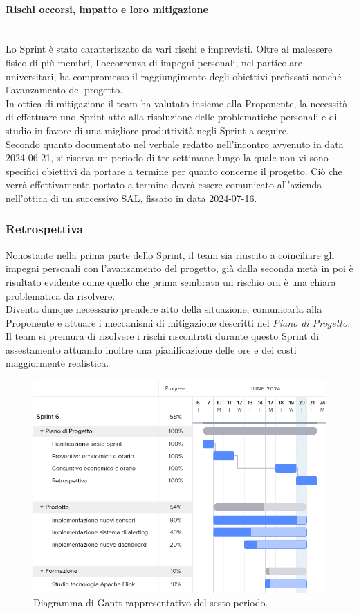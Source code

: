 \documentclass[8pt]{article}
\newcommand{\subsubsubsection}[1]{\paragraph{#1}\mbox{}\\}
\begin{document}
\subsubsubsection{Rischi occorsi, impatto e loro mitigazione}
Lo Sprint è stato caratterizzato da vari rischi e imprevisti. Oltre al malessere fisico di più membri, l'occorrenza di impegni personali, nel particolare universitari, ha compromesso il raggiungimento degli obiettivi prefissati nonché l'avanzamento del progetto.\\
In ottica di mitigazione il team ha valutato insieme alla Proponente, la necessità di effettuare uno Sprint atto alla risoluzione delle problematiche personali e di studio in favore di una migliore produttività negli Sprint a seguire.\\
Secondo quanto documentato nel verbale redatto nell'incontro avvenuto in data 2024-06-21, si riserva un periodo di tre settimane lungo la quale non vi sono specifici obiettivi da portare a termine per quanto concerne il progetto. 
Ciò che verrà effettivamente portato a termine dovrà essere comunicato all'azienda nell'ottica di un successivo SAL, fissato in data 2024-07-16.

\subsubsection{Retrospettiva}

Nonostante nella prima parte dello Sprint, il team sia riuscito a coinciliare gli impegni personali con l'avanzamento del progetto, già dalla seconda metà in poi è risultato evidente come quello che prima sembrava un rischio ora è una chiara problematica da risolvere.\\
Diventa dunque necessario prendere atto della situazione, comunicarla alla Proponente e attuare i meccanismi di mitigazione descritti nel \textit{Piano di Progetto}. 
Il team si premura di risolvere i rischi riscontrati durante questo Sprint di assestamento attuando inoltre una pianificazione delle ore e dei costi maggiormente realistica.

\begin{figure}[h!]
    \centering
    \includegraphics[width=13cm]{./images_pdp/gantt6.png}
    \caption{Diagramma di Gantt rappresentativo del sesto periodo.}
\end{figure}
\clearpage
\end{document}
